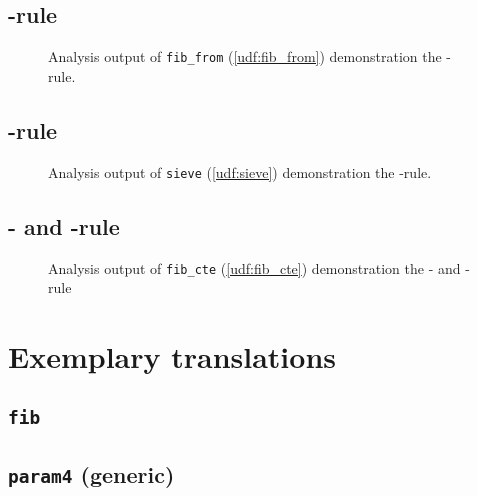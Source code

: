 \FloatBarrier
\newpage
\subsection{{\normalfont\RFROM}-rule}

\begin{figure}[h!]
    \centering
    
    \caption{Analysis output of \texttt{fib\_from} (\autoref{udf:fib_from}) demonstration the \RFROM-rule.}
    \label{scenarios:fib_from}
\end{figure}
\FloatBarrier
\newpage
\subsection{{\normalfont\RWHERE}-rule}

\begin{figure}[h!]
    \centering
    
    \caption{Analysis output of \texttt{sieve} (\autoref{udf:sieve}) demonstration the \RFROM-rule.}
    \label{scenarios:sieve}
\end{figure}
\FloatBarrier
\newpage
{}
\subsection{{\normalfont\RCTE}- and {\normalfont\RWITH}-rule}

\begin{figure}[h!]
    \centering
    
    \caption{Analysis output of \texttt{fib\_cte} (\autoref{udf:fib_cte}) demonstration the \RCTE- and \RWITH-rule}
    \label{scenarios:fib_cte}
\end{figure}
\FloatBarrier
\restoregeometry




\section{Exemplary translations}\label{appendix:translations}
\subsection{\texttt{fib}}
\restoregeometry
\clearpage
\FloatBarrier
\newpage

\subsection{\texttt{param4} (generic)}
\clearpage
\newpage

